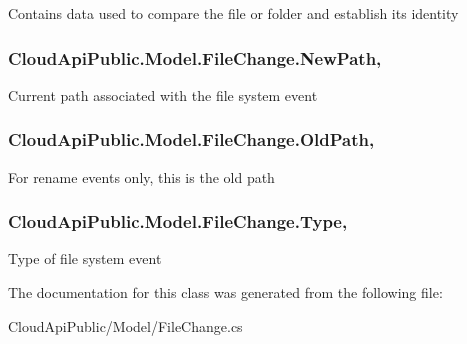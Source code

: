 Contains data used to compare the file or folder and establish its identity 

\hypertarget{class_cloud_api_public_1_1_model_1_1_file_change_ad7383c43cc51606f17c63fad6c032c7c}{
\subsubsection[{New\-Path}]{ Cloud\-Api\-Public.\-Model.\-File\-Change.\-New\-Path\hspace{0.3cm}{\ttfamily [get]}, {\ttfamily [set]}}}\label{class_cloud_api_public_1_1_model_1_1_file_change_ad7383c43cc51606f17c63fad6c032c7c}


Current path associated with the file system event 

\hypertarget{class_cloud_api_public_1_1_model_1_1_file_change_a08ced19e1fccebb04bf6da37f21a4216}{
\subsubsection[{Old\-Path}]{ Cloud\-Api\-Public.\-Model.\-File\-Change.\-Old\-Path\hspace{0.3cm}{\ttfamily [get]}, {\ttfamily [set]}}}\label{class_cloud_api_public_1_1_model_1_1_file_change_a08ced19e1fccebb04bf6da37f21a4216}


For rename events only, this is the old path 

\hypertarget{class_cloud_api_public_1_1_model_1_1_file_change_a6a1aeec98ba00f051497c5126adf69a4}{
\subsubsection[{Type}]{ Cloud\-Api\-Public.\-Model.\-File\-Change.\-Type\hspace{0.3cm}{\ttfamily [get]}, {\ttfamily [set]}}}\label{class_cloud_api_public_1_1_model_1_1_file_change_a6a1aeec98ba00f051497c5126adf69a4}


Type of file system event 



The documentation for this class was generated from the following file\-:\begin{DoxyCompactItemize}
\item 
Cloud\-Api\-Public/\-Model/File\-Change.\-cs\end{DoxyCompactItemize}
